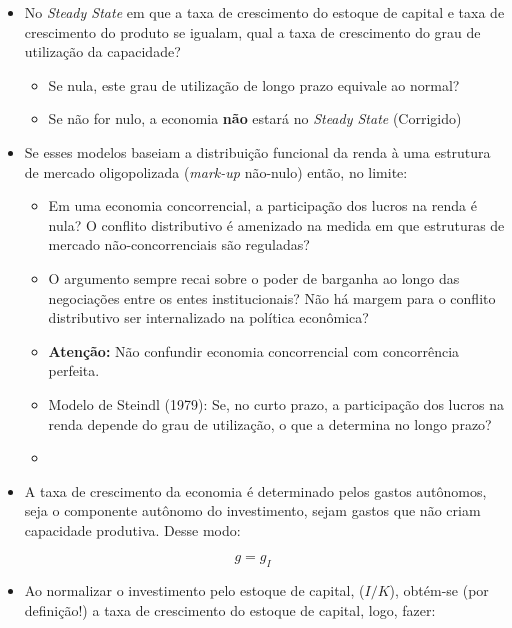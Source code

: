 \documentclass[]{article}
\providecommand{\tightlist}{%
  \setlength{\itemsep}{0pt}\setlength{\parskip}{0pt}}
\begin{document}
\begin{itemize}
\tightlist
\item
  [\done] No \emph{Steady State} em que a taxa de crescimento do estoque
  de capital e taxa de crescimento do produto se igualam, qual a taxa de
  crescimento do grau de utilização da capacidade?

  \begin{itemize}
  \tightlist
  \item
    [\done] Se nula, este grau de utilização de longo prazo equivale ao
    normal?
  \item[\done] Se não for nulo, a economia \textbf{não} estará no \emph{Steady
    State} (Corrigido)
  \end{itemize}
\item
  [\done] Se esses modelos baseiam a distribuição funcional da renda à
  uma estrutura de mercado oligopolizada (\emph{mark-up} não-nulo)
  então, no limite:

  \begin{itemize}
  \tightlist
  \item
    [\done] Em uma economia concorrencial, a participação dos lucros na
    renda é nula? O conflito distributivo é amenizado na medida em que
    estruturas de mercado não-concorrenciais são reguladas?
  \item
    [\done] O argumento sempre recai sobre o poder
    de barganha ao longo das negociações entre os entes institucionais? Não há margem para o conflito distributivo ser internalizado na
    política econômica?
    \item \textbf{Atenção:} Não confundir economia concorrencial com concorrência perfeita.
  \item
    [\done]  Modelo de Steindl (1979): Se, no curto prazo, a
    participação dos lucros na renda depende do grau de utilização, o
    que a determina no longo prazo?
  \item
    [\done]
  \end{itemize}
\item
  [\done] A taxa de crescimento da economia é determinado pelos gastos
  autônomos, seja o componente autônomo do investimento, sejam gastos
  que não criam capacidade produtiva. Desse modo:
\end{itemize}

\begin{equation}
g = g_I
\end{equation}

\begin{itemize}
\tightlist
\item
  Ao normalizar o investimento pelo estoque de capital, (\(I/K\)),
  obtém-se (por definição!) a taxa de crescimento do estoque de capital,
  logo, fazer:
\end{itemize}
\end{document}
